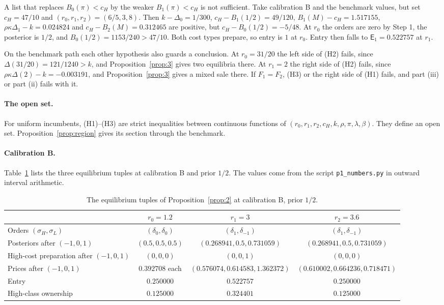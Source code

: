 \documentclass[11pt]{article}
\theoremstyle{definition}
\newcommand{\Ent}{\mathsf E}
\begin{document}
A list that replaces $B_0(\pi)<c_H$ by the weaker $B_1(\pi)<c_H$ is not sufficient. Take calibration B and the
benchmark values, but set $c_H=47/10$ and $(r_0,r_1,r_2)=(6/5,3,8)$. Then $k-\Delta_0=1/300$,
$c_H-B_1(1/2)=49/120$, $B_1(M)-c_H=1.517155$, $\rho\kappa\Delta_1-k=0.024824$ and $c_H-B_2(M)=0.312465$ are positive,
but $c_H-B_0(1/2)=-5/48$. At $r_0$ the orders are zero by Step 1, the posterior is $1/2$, and
$B_0(1/2)=1153/240>47/10$. Both cost types prepare, so entry is $1$ at $r_0$. Entry then falls to
$\Ent_1=0.522757$ at $r_1$.

On the benchmark path each other hypothesis also guards a conclusion. At $r_0=31/20$ the left side of (H2)
fails, since $\Delta(31/20)=121/1240>k$, and Proposition~\ref{prop:3} gives two equilibria there. At $r_1=2$ the
right side of (H2) fails, since $\rho\kappa\Delta(2)-k=-0.003191$, and Proposition~\ref{prop:3} gives a mixed sale
there. If $F_1=F_2$, (H3) or the right side of (H1) fails, and part (iii) or part (ii) fails with it.

\paragraph{The open set.} For uniform incumbents, (H1)--(H3) are strict inequalities between continuous
functions of $(r_0,r_1,r_2,c_H,k,\rho,\pi,\lambda,\beta)$. They define an open set. Proposition~\ref{prop:region}
gives its section through the benchmark.

\paragraph{Calibration B.} Table~\ref{tab:prop2} lists the three equilibrium tuples at calibration B and prior
$1/2$. The values come from the script \texttt{p1\_numbers.py} in outward interval arithmetic.

\begin{table}[h]
\centering
\caption{The equilibrium tuples of Proposition~\ref{prop:2} at calibration B, prior $1/2$.}\label{tab:prop2}
\small
\begin{tabular}{@{}lccc@{}}
\toprule
 & $r_0=1.2$ & $r_1=3$ & $r_2=3.6$\\
\midrule
Orders $(\sigma_H,\sigma_L)$ & $(\delta_0,\delta_0)$ & $(\delta_1,\delta_{-1})$ & $(\delta_1,\delta_{-1})$\\
Posteriors after $(-1,0,1)$ & $(0.5,0.5,0.5)$ & $(0.268941,0.5,0.731059)$ & $(0.268941,0.5,0.731059)$\\
High-cost preparation after $(-1,0,1)$ & $(0,0,0)$ & $(0,0,1)$ & $(0,0,0)$\\
Prices after $(-1,0,1)$ & $0.392708$ each & $(0.576074,0.614583,1.362372)$ & $(0.610002,0.664236,0.718471)$\\
Entry & $0.250000$ & $0.522757$ & $0.250000$\\
High-class ownership & $0.125000$ & $0.324401$ & $0.125000$\\
\bottomrule
\end{tabular}
\end{table}
\end{document}
